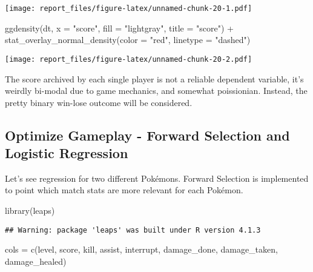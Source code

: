 \documentclass[
]{article}
\newenvironment{Shaded}{\begin{snugshade}}{\end{snugshade}}
\newcommand{\AttributeTok}[1]{\textcolor[rgb]{0.77,0.63,0.00}{#1}}
\newcommand{\FunctionTok}[1]{\textcolor[rgb]{0.00,0.00,0.00}{#1}}
\newcommand{\NormalTok}[1]{#1}
\newcommand{\OtherTok}[1]{\textcolor[rgb]{0.56,0.35,0.01}{#1}}
\newcommand{\SpecialCharTok}[1]{\textcolor[rgb]{0.00,0.00,0.00}{#1}}
\newcommand{\StringTok}[1]{\textcolor[rgb]{0.31,0.60,0.02}{#1}}
\begin{document}
\texttt{[image: report\_files/figure-latex/unnamed-chunk-20-1.pdf]}

\begin{Shaded}
\begin{Highlighting}[]
\FunctionTok{ggdensity}\NormalTok{(dt, }\AttributeTok{x =} \StringTok{"score"}\NormalTok{, }\AttributeTok{fill =} \StringTok{"lightgray"}\NormalTok{, }\AttributeTok{title =} \StringTok{"score"}\NormalTok{) }\SpecialCharTok{+}
  \FunctionTok{stat\_overlay\_normal\_density}\NormalTok{(}\AttributeTok{color =} \StringTok{"red"}\NormalTok{, }\AttributeTok{linetype =} \StringTok{"dashed"}\NormalTok{)}
\end{Highlighting}
\end{Shaded}

\texttt{[image: report\_files/figure-latex/unnamed-chunk-20-2.pdf]}

The score archived by each single player is not a reliable dependent
variable, it's weirdly bi-modal due to game mechanics, and somewhat
poissionian. Instead, the pretty binary win-lose outcome will be
considered.

\hypertarget{optimize-gameplay---forward-selection-and-logistic-regression}{%
\subsection{Optimize Gameplay - Forward Selection and Logistic
Regression}\label{optimize-gameplay---forward-selection-and-logistic-regression}}

Let's see regression for two different Pokémons. Forward Selection is
implemented to point which match stats are more relevant for each
Pokémon.

\begin{Shaded}
\begin{Highlighting}[]
\FunctionTok{library}\NormalTok{(leaps)}
\end{Highlighting}
\end{Shaded}

\begin{verbatim}
## Warning: package 'leaps' was built under R version 4.1.3
\end{verbatim}

\begin{Shaded}
\begin{Highlighting}[]
\NormalTok{cols }\OtherTok{=} \FunctionTok{c}\NormalTok{(}\StringTok{\textquotesingle{}level\textquotesingle{}}\NormalTok{, }\StringTok{\textquotesingle{}score\textquotesingle{}}\NormalTok{, }\StringTok{\textquotesingle{}kill\textquotesingle{}}\NormalTok{, }\StringTok{\textquotesingle{}assist\textquotesingle{}}\NormalTok{, }\StringTok{\textquotesingle{}interrupt\textquotesingle{}}\NormalTok{, }\StringTok{\textquotesingle{}damage\_done\textquotesingle{}}\NormalTok{, }\StringTok{\textquotesingle{}damage\_taken\textquotesingle{}}\NormalTok{, }\StringTok{\textquotesingle{}damage\_healed\textquotesingle{}}\NormalTok{)}
\end{Highlighting}
\end{Shaded}
\end{document}
